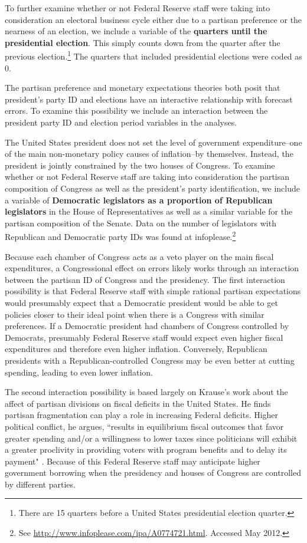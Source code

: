 \documentclass[a4paper]{article}
\begin{document}
To further examine whether or not Federal Reserve staff were taking into consideration an electoral business cycle either due to a partisan preference or the nearness of an election, we include a variable of the {\bf{quarters until the presidential election}}. This simply counts down from the quarter after the previous election.\footnote{There are 15 quarters before a United States presidential election quarter.} The quarters that included presidential elections were coded as 0. 

The partisan preference and monetary expectations theories both posit that president's party ID and elections have an interactive relationship with forecast errors. To examine this possibility we include an interaction between the president party ID and election period variables in the analyses.

The United States president does not set the level of government expenditure--one of the main non-monetary policy causes of inflation--by themselves. Instead, the president is jointly constrained by the two houses of Congress. To examine whether or not Federal Reserve staff are taking into consideration the partisan composition of Congress as well as the president's party identification, we include a variable of {\bf{Democratic legislators as a proportion of Republican legislators}} in the House of Representatives as well as a similar variable for the partisan composition of the Senate. Data on the number of legislators with Republican and Democratic party IDs was found at infoplease.\footnote{See {\url{http://www.infoplease.com/ipa/A0774721.html}}. Accessed May 2012.} 

Because each chamber of Congress acts as a veto player on the main fiscal expenditures, a Congressional effect on errors likely works through an interaction between the partisan ID of Congress and the presidency. The first interaction possibility is that Federal Reserve staff with simple rational partisan expectations would presumably expect that a Democratic president would be able to get policies closer to their ideal point when there is a Congress with similar preferences. If a Democratic president had chambers of Congress controlled by Democrats, presumably Federal Reserve staff would expect even higher fiscal expenditures and therefore even higher inflation. Conversely, Republican presidents with a Republican-controlled Congress may be even better at cutting spending, leading to even lower inflation.

The second interaction possibility is based largely on Krause's \citeyearpar{Krause2000} work about the affect of partisan divisions on fiscal deficits in the United States. He finds partisan fragmentation can play a role in increasing Federal deficits. Higher political conflict, he argues, ``results in equilibrium fiscal outcomes that favor greater spending and/or a willingness to lower taxes since politicians will exhibit a greater proclivity in providing voters with program benefits and to delay its payment" \citep[][542]{Krause2000}. Because of this Federal Reserve staff may anticipate higher government borrowing when the presidency and houses of Congress are controlled by different parties. 
\end{document}
